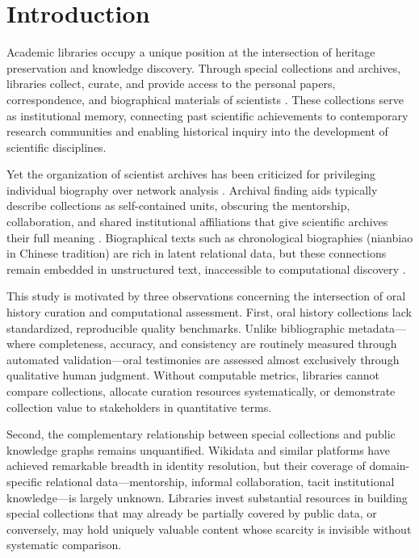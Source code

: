 \documentclass[review]{elsarticle}
\begin{document}
\section{Introduction}

Academic libraries occupy a unique position at the intersection of heritage preservation and knowledge discovery. Through special collections and archives, libraries collect, curate, and provide access to the personal papers, correspondence, and biographical materials of scientists \cite{oneill2019special,dooley2010taking}. These collections serve as institutional memory, connecting past scientific achievements to contemporary research communities and enabling historical inquiry into the development of scientific disciplines.

Yet the organization of scientist archives has been criticized for privileging individual biography over network analysis \cite{kwasnik2019knowledge}. Archival finding aids typically describe collections as self-contained units, obscuring the mentorship, collaboration, and shared institutional affiliations that give scientific archives their full meaning \cite{trace2012evolution,trace2020information}. Biographical texts such as chronological biographies (nianbiao in Chinese tradition) are rich in latent relational data, but these connections remain embedded in unstructured text, inaccessible to computational discovery \cite{griffin2014text}.

This study is motivated by three observations concerning the intersection of oral history curation and computational assessment. First, oral history collections lack standardized, reproducible quality benchmarks. Unlike bibliographic metadata---where completeness, accuracy, and consistency are routinely measured through automated validation---oral testimonies are assessed almost exclusively through qualitative human judgment. Without computable metrics, libraries cannot compare collections, allocate curation resources systematically, or demonstrate collection value to stakeholders in quantitative terms.

Second, the complementary relationship between special collections and public knowledge graphs remains unquantified. Wikidata and similar platforms have achieved remarkable breadth in identity resolution, but their coverage of domain-specific relational data---mentorship, informal collaboration, tacit institutional knowledge---is largely unknown. Libraries invest substantial resources in building special collections that may already be partially covered by public data, or conversely, may hold uniquely valuable content whose scarcity is invisible without systematic comparison.
\end{document}
